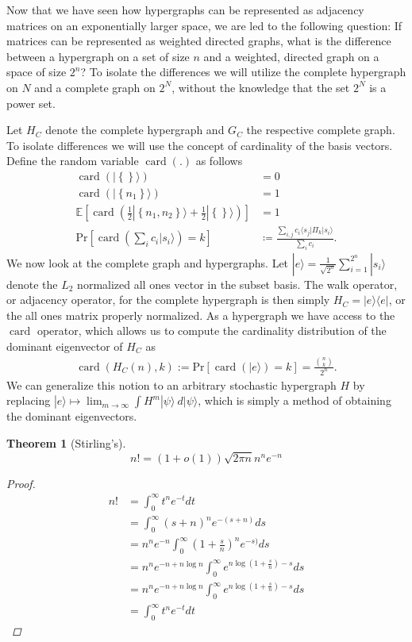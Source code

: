\documentclass{article}
\newcommand{\ket}[1]{|#1\rangle}
\newcommand{\bra}[1]{\langle #1|}
\newcommand{\ketbra}[2]{| #1\rangle\! \langle #2|}
\newcommand{\parens}[1]{\left( #1 \right)}
\newcommand{\brackets}[1]{\left[ #1 \right]}
\newcommand{\set}[1]{\left\{ #1 \right\}}
\newcommand{\expect}[1]{\mathbb{E}\brackets{#1}}
\newcommand{\prob}[1]{\text{Pr}\left[ #1 \right]}
\DeclareMathOperator{\card}{card}
\newcommand{\cardi}[1]{\card \parens{ #1 }}
\newtheorem{theorem}{Theorem}
\begin{document}
Now that we have seen how hypergraphs can be represented as adjacency matrices on an exponentially larger space, we are led to the following question: If matrices can be represented as weighted directed graphs, what is the difference between a hypergraph on a set of size $n$ and a weighted, directed graph on a space of size $2^n$? To isolate the differences we will utilize the complete hypergraph on $N$ and a complete graph on $2^N$, without the knowledge that the set $2^N$ is a power set. 

Let $H_C$ denote the complete hypergraph and $G_C$ the respective complete graph. To isolate differences we will use the concept of cardinality of the basis vectors. Define the random variable $\card(.)$ as follows
\begin{align}
    \card(\ket{\set{}}) &= 0 \\
    \card(\ket{\set{n_1}}) &= 1 \\
    \expect{\cardi{\frac{1}{2} \ket{\set{n_1, n_2}} + \frac{1}{2} \ket{\set{}} }} &= 1 \\
    \prob{\cardi{\sum_{i} c_i \ket{s_i}} = k } & \coloneqq \frac{\sum_{i,j} c_i \bra{s_j} \Pi_k \ket{s_i}}{ \sum_i c_i}.
\end{align}
We now look at the complete graph and hypergraphs. Let $\ket{e} = \frac{1}{\sqrt{2^n}} \sum_{i=1}^{2^n} \ket{s_i}$ denote the $L_2$ normalized all ones vector in the subset basis. The walk operator, or adjacency operator, for the complete hypergraph is then simply $H_C = \ketbra{e}{e}$, or the all ones matrix properly normalized. As a hypergraph we have access to the $\card$ operator, which allows us to compute the cardinality distribution of the dominant eigenvector of $H_C$ as
\begin{align}
    \cardi{H_C(n), k} := \prob{\cardi{\ket{e}} = k } = \frac{\binom{n}{k}}{2^n}.
\end{align}
We can generalize this notion to an arbitrary stochastic hypergraph $H$  by replacing $\ket{e} \mapsto \lim_{m \to \infty} \int H^m \ket{\psi} ~d\ket{\psi} $, which is simply a method of obtaining the dominant eigenvectors.

\begin{theorem}[Stirling's]
    \begin{equation}
        n! = (1 + o(1)) \sqrt{2 \pi n} n^n e^{-n}
    \end{equation}
    \begin{proof}
    \begin{align}
        n! &= \int_0^\infty t^n e^{-t} dt \\
        &= \int_0^\infty (s+n)^{n} e^{-(s+n)} ds \\
        &= n^n e^{-n} \int_0^\infty \parens{ 1 + \frac{s}{n}}^{n} e^{-s)} ds \\
        &= n^n e^{-n + n \log n} \int_0^\infty e^{n \log \parens{1 + \frac{s}{n}} - s} ds \\
        &= n^n e^{-n + n \log n} \int_0^\infty e^{n \log \parens{1 + \frac{s}{n}} - s} ds \\
        &= \int_0^\infty t^n e^{-t} dt 
    \end{align}
\end{proof}
\end{theorem}
\end{document}
